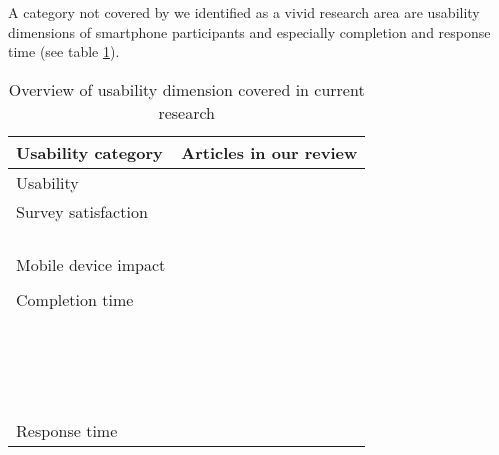 A category not covered by \cite{biemer_total_2010} we identified as a vivid research area are usability dimensions of smartphone participants and especially completion and response time (see table \ref{tab: usability}).

\begin{table}
    \centering
	\begin{tabular}{ll}
		\toprule
		Usability category & Articles in our review\\
		\midrule
		Usability & \cite{mavletova_grid_2018, huff_comparison_2015}\\
        Survey satisfaction & \cite{de_bruijne_comparing_2013}\\
    	& \cite{mavletova_grid_2018}\\
    	& \cite{mavletova_sensitive_2013}\\
    	& \cite{lugtig_use_2016}\\
    	& \cite{toepoel_what_2014}\\
        Mobile device impact & \cite{schlosser_mobile_2018}\\
    	& \cite{mavletova_mobile_2014}\\
        Completion time & \cite{revilla_are_2017, ha_are_2019}\\
    	& \cite{revilla_are_2017, de_bruijne_comparing_2013}\\
    	& \cite{weigold_computerized_2021, ha_data_2020}\\
    	& \cite{mavletova_data_2013, hartman_does_2019}\\
    	& \cite{liebe_does_2015, antoun_effects_2017}\\
    	& \cite{lee_experimental_2019, gummer_explaining_2015}\\
    	& \cite{antoun_factors_2020, mavletova_grid_2018}\\
    	& \cite{lambert_living_2015}\\
    	& \cite{buskirk_making_2014}\\
    	& \cite{schlosser_mobile_2018, zou_mobile_2021}\\
    	& \cite{daikeler_motivated_2020, revilla_open_2016}\\
    	& \cite{skeie_smartphone_2019, revilla_testing_2018}\\
    	& \cite{huff_comparison_2015, mason_effect_2019}\\
    	& \cite{struminskaya_effects_2015}\\
    	& \cite{lugtig_use_2016}\\
    	& \cite{tourangeau_web_2018, keusch_web_2017}\\
    	& \cite{toepoel_what_2014}\\
    	& \cite{couper_why_2017}\\
    	Response time & \cite{liebe_does_2015, schlosser_mobile_2018}\\
        \bottomrule
    \end{tabular}
	\caption{Overview of usability dimension covered in current research}
	\label{tab: usability}
\end{table}

